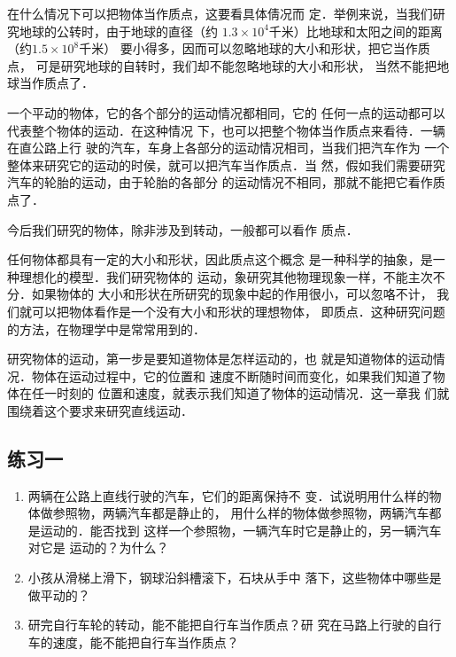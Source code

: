     在什么情况下可以把物体当作质点，这要看具体倩况而
定．举例来说，当我们研究地球的公转时，由于地球的直径（约
$1.3\times 10^4$千米）比地球和太阳之间的距离（约$1.5\times 10^8$千米）
要小得多，因而可以忽略地球的大小和形状，把它当作质点，
可是研究地球的自转时，我们却不能忽略地球的大小和形状，
当然不能把地球当作质点了．

    一个平动的物体，它的各个部分的运动情况都相同，它的
任何一点的运动都可以代表整个物体的运动．在这种情况
下，也可以把整个物体当作质点来看待．一辆在直公路上行
驶的汽车，车身上各部分的运动情况相司，当我们把汽车作为
一个整体来研究它的运动的时侯，就可以把汽车当作质点．当
然，假如我们需要研究汽车的轮胎的运动，由于轮胎的各部分
的运动情况不相同，那就不能把它看作质点了．

    今后我们研究的物体，除非涉及到转动，一般都可以看作
质点．

    任何物体都具有一定的大小和形状，因此质点这个概念
是一种科学的抽象，是一种理想化的模型．我们研究物体的
运动，象研究其他物理现象一样，不能主次不分．如果物体的
大小和形状在所研究的现象中起的作用很小，可以忽咯不计，
我们就可以把物体看作是一个没有大小和形状的理想物体，
即质点．这种研究问题的方法，在物理学中是常常用到的．

    研究物体的运动，第一步是要知道物体是怎样运动的，也
就是知道物体的运动情况．物体在运动过程中，它的位置和
速度不断随时间而变化，如果我们知道了物体在任一时刻的
位置和速度，就表示我们知道了物体的运动情况．这一章我
们就围绕着这个要求来研究直线运动．

 \subsection*{练习一}
\begin{enumerate}
\item 两辆在公路上直线行驶的汽车，它们的距离保持不
变．试说明用什么样的物体做参照物，两辆汽车都是静止的，
用什么样的物体做参照物，两辆汽车都是运动的．能否找到
这样一个参照物，一辆汽车时它是静止的，另一辆汽车对它是
运动的？为什么？

\item 小孩从滑梯上滑下，钢球沿斜槽滚下，石块从手中
落下，这些物体中哪些是做平动的？

\item 研完自行车轮的转动，能不能把自行车当作质点？研
究在马路上行驶的自行车的速度，能不能把自行车当作质点？
\end{enumerate}

